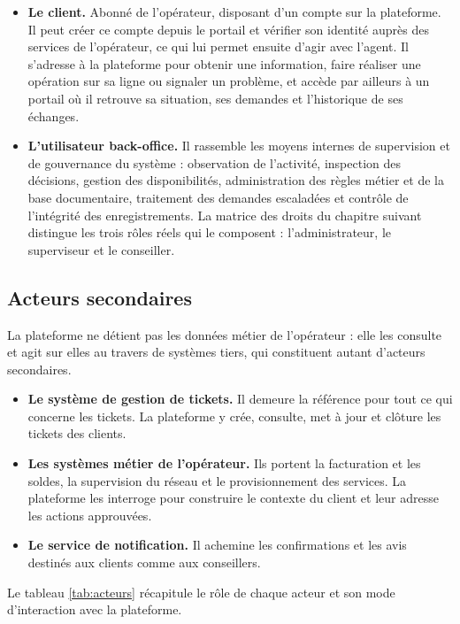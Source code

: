 \begin{itemize}
  \item \textbf{Le client.} Abonné de l'opérateur, disposant d'un compte sur la plateforme. Il peut créer ce compte depuis le portail et vérifier son identité auprès des services de l'opérateur, ce qui lui permet ensuite d'agir avec l'agent. Il s'adresse à la plateforme pour obtenir une information, faire réaliser une opération sur sa ligne ou signaler un problème, et accède par ailleurs à un portail où il retrouve sa situation, ses demandes et l'historique de ses échanges.
  \item \textbf{L'utilisateur back-office.} Il rassemble les moyens internes de supervision et de gouvernance du système : observation de l'activité, inspection des décisions, gestion des disponibilités, administration des règles métier et de la base documentaire, traitement des demandes escaladées et contrôle de l'intégrité des enregistrements. La matrice des droits du chapitre suivant distingue les trois rôles réels qui le composent : l'administrateur, le superviseur et le conseiller.
\end{itemize}

\subsection{Acteurs secondaires}

La plateforme ne détient pas les données métier de l'opérateur : elle les consulte et agit sur elles au travers de systèmes tiers, qui constituent autant d'acteurs secondaires.

\begin{itemize}
  \item \textbf{Le système de gestion de tickets.} Il demeure la référence pour tout ce qui concerne les tickets. La plateforme y crée, consulte, met à jour et clôture les tickets des clients.
  \item \textbf{Les systèmes métier de l'opérateur.} Ils portent la facturation et les soldes, la supervision du réseau et le provisionnement des services. La plateforme les interroge pour construire le contexte du client et leur adresse les actions approuvées.
  \item \textbf{Le service de notification.} Il achemine les confirmations et les avis destinés aux clients comme aux conseillers.
\end{itemize}

Le tableau \ref{tab:acteurs} récapitule le rôle de chaque acteur et son mode d'interaction avec la plateforme.

